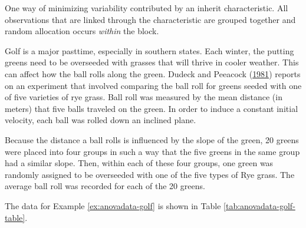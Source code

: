 \documentclass[]{book}
\theoremstyle{definition}
\theoremstyle{definition}
\theoremstyle{definition}
\theoremstyle{remark}
\let\BeginKnitrBlock\begin \let\EndKnitrBlock\end
\begin{document}
\BeginKnitrBlock{definition}[Blocking]
\protect\hypertarget{def:defn-blocking}{}{\label{def:defn-blocking}
{} }One way of minimizing variability contributed
by an inherit characteristic. All observations that are linked through
the characteristic are grouped together and random allocation occurs
\emph{within} the block.
\EndKnitrBlock{definition}

\BeginKnitrBlock{example}[Overseeding Golf Greens]
\protect\hypertarget{exm:anovadata-golf}{}{\label{exm:anovadata-golf}
{} }Golf is a major pasttime,
especially in southern states. Each winter, the putting greens need to
be overseeded with grasses that will thrive in cooler weather. This can
affect how the ball rolls along the green. Dudeck and Peeacock
(\protect\hyperlink{ref-Dudeck1981}{1981}) reports on an experiment that
involved comparing the ball roll for greens seeded with one of five
varieties of rye grass. Ball roll was measured by the mean distance (in
meters) that five balls traveled on the green. In order to induce a
constant initial velocity, each ball was rolled down an inclined plane.

Because the distance a ball rolls is influenced by the slope of the
green, 20 greens were placed into four groups in such a way that the
five greens in the same group had a similar slope. Then, within each of
these four groups, one green was randomly assigned to be overseeded with
one of the five types of Rye grass. The average ball roll was recorded
for each of the 20 greens.
\EndKnitrBlock{example}

The data for Example \ref{ex:anovadata-golf} is shown in Table
\ref{tab:anovadata-golf-table}.
\end{document}

